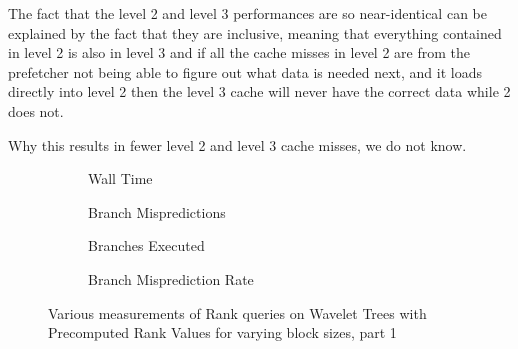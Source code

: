 The fact that the level 2 and level 3 performances are so near-identical can be explained by the fact that they are inclusive, meaning that everything contained in level 2 is also in level 3 and
if all the cache misses in level 2 are from the prefetcher not being able to figure out what data is needed next, and it loads directly into level 2 then the level 3 cache will never have the correct data while 2 does not.

Why this results in fewer level 2 and level 3 cache misses, we do not know.





\begin{figure}\tiny

\begin{subfigure}{0.48\textwidth}
	
	\caption{Wall Time}
	\label{fig:PrecomputedRankBlockSize_Rank_WallTime}
\end{subfigure}
\hfill
\begin{subfigure}{0.48\textwidth}
	
	\caption{Branch Mispredictions}
	\label{fig:PrecomputedRankBlockSize_Rank_BranchMiss}
\end{subfigure}

\begin{subfigure}{0.48\textwidth}
	
	\caption{Branches Executed}
	\label{fig:PrecomputedRankBlockSize_Rank_BranchExe}
\end{subfigure}
\hfill	
\begin{subfigure}{0.48\textwidth}
	
	\caption{Branch Misprediction Rate}
	\label{fig:PrecomputedRankBlockSize_Rank_BranchMissRate}
\end{subfigure}
\caption{Various measurements of Rank queries on Wavelet Trees with Precomputed Rank Values for varying block sizes, part 1}
\label{fig:PrecomputedRankBlockSize_Rank}
\end{figure}

